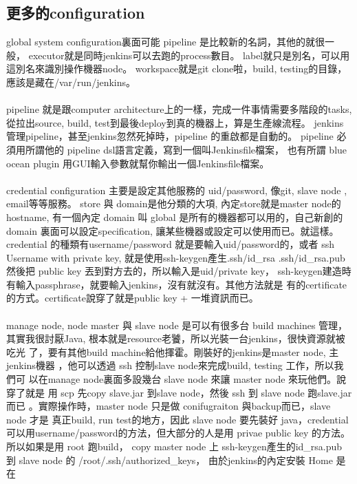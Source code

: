   \subsection{更多的configuration}
  global system configuration裏面可能 pipeline 是比較新的名詞，其他的就很一般，
  executor就是同時jenkins可以去跑的process數目。
  label就只是別名，可以用這別名來識別操作機器node。
  workspace就是git clone啦，build, testing的目錄，應該是藏在/var/run/jenkins。
  \\\\
  pipeline 就是跟computer architecture上的一樣，完成一件事情需要多階段的tasks,
  從拉出source, build, test到最後deploy到真的機器上，算是生產線流程。
  jenkins管理pipeline，甚至jenkins忽然死掉時，pipeline 的重啟都是自動的。
  pipeline 必須用所謂他的 pipeline dsl語言定義，寫到一個叫Jenkinsfile檔案，
  也有所謂 blue ocean plugin 用GUI輸入參數就幫你輸出一個Jenkinsfile檔案。
  \\\\
  credential configuration 主要是設定其他服務的 uid/password, 像git, slave node
  , email等等服務。 store 與 domain是他分類的大項, 內定store就是master node的
  hostname, 有一個內定 domain 叫 global 是所有的機器都可以用的，自己新創的domain
  裏面可以設定specification, 讓某些機器或設定可以使用而已。就這樣。credential
  的種類有username/password 就是要輸入uid/password的，或者
  ssh Username with private key, 就是使用ssh-keygen產生.ssh/id\_rsa 
  .ssh/id\_rsa.pub 然後把 public key 丟到對方去的，所以輸入是uid/private key，
  ssh-keygen建造時有輸入passphrase，就要輸入jenkins，沒有就沒有。其他方法就是
  有的certificate的方式。certificate說穿了就是public key + 一堆資訊而已。
  \\\\
  manage node, node master 與 slave node 是可以有很多台 build machines 管理，
  其實我很討厭Java, 根本就是resource老饕，所以光裝一台jenkins，很快資源就被吃光
  了，要有其他build machine給他揮霍。剛裝好的jenkins是master node, 主jenkins機器
  ，他可以透過 ssh 控制slave node來完成build, testing 工作，所以我們可
  以在manage node裏面多設幾台 slave node 來讓 master node 來玩他們。說穿了就是
  用 scp 先copy slave.jar 到slave node，然後 ssh 到 slave node 跑slave.jar 而已
  。實際操作時，master node 只是做 conifugraiton 與backup而已，slave node 才是
  真正build, run test的地方，因此 slave node 要先裝好 java，credential
  可以用username/password的方法，但大部分的人是用 privae public key 的方法。
  所以如果是用 root 跑build， copy master node 上 ssh-keygen產生的id\_rsa.pub 到
  slave node 的 /root/.ssh/authorized\_keys， 由於jenkins的內定安裝 Home 是在
